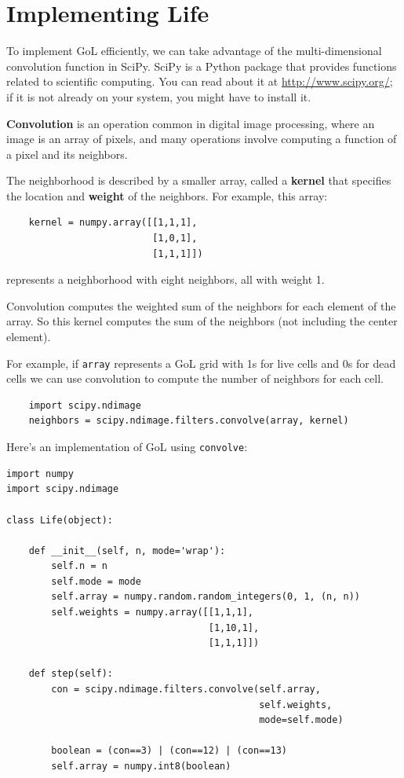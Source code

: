 \documentclass[10pt]{book}
\begin{document}
\section{Implementing Life}

To implement GoL efficiently, we can take advantage of the
multi-dimensional convolution function in SciPy.  SciPy is a Python
package that provides functions related to scientific computing.
You can read about it at \url{http://www.scipy.org/}; if it is not
already on your system, you might have to install it.

{\bf Convolution} is an operation common in digital image processing,
where an image is an array of pixels, and many operations involve
computing a function of a pixel and its neighbors.

The neighborhood is described by a smaller array, called a {\bf kernel}
that specifies the location and {\bf weight} of the neighbors.  For
example, this array:

\begin{verbatim}
    kernel = numpy.array([[1,1,1],
                          [1,0,1],
                          [1,1,1]])
\end{verbatim}

represents a neighborhood with eight neighbors, all with weight 1.

Convolution computes the weighted sum of the neighbors for each
element of the array.  So this kernel computes the sum of the
neighbors (not including the center element).

For example, if {\tt array} represents a GoL grid with 1s for live
cells and 0s for dead cells we can use convolution to compute the
number of neighbors for each cell.

\begin{verbatim}
    import scipy.ndimage
    neighbors = scipy.ndimage.filters.convolve(array, kernel)
\end{verbatim}

Here's an implementation of GoL using {\tt convolve}:

\begin{verbatim}
import numpy
import scipy.ndimage

class Life(object):

    def __init__(self, n, mode='wrap'):
        self.n = n
        self.mode = mode
        self.array = numpy.random.random_integers(0, 1, (n, n))
        self.weights = numpy.array([[1,1,1],
                                    [1,10,1],
                                    [1,1,1]])

    def step(self):
        con = scipy.ndimage.filters.convolve(self.array,
                                             self.weights,
                                             mode=self.mode)

        boolean = (con==3) | (con==12) | (con==13)
        self.array = numpy.int8(boolean)
\end{verbatim}
\end{document}
